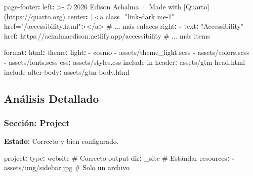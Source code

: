 \documentclass[
  doc,
  floatsintext,
  longtable,
  a4paper,
  nolmodern,
  notxfonts,
  notimes,
  12pt,
  colorlinks=true,linkcolor=blue,citecolor=blue,urlcolor=blue]{apa7}
\newenvironment{Shaded}{\begin{snugshade}}{\end{snugshade}}
\newcommand{\AttributeTok}[1]{\textcolor[rgb]{0.40,0.45,0.13}{#1}}
\newcommand{\CharTok}[1]{\textcolor[rgb]{0.13,0.47,0.30}{#1}}
\newcommand{\CommentTok}[1]{\textcolor[rgb]{0.37,0.37,0.37}{#1}}
\newcommand{\FunctionTok}[1]{\textcolor[rgb]{0.28,0.35,0.67}{#1}}
\newcommand{\KeywordTok}[1]{\textcolor[rgb]{0.00,0.23,0.31}{\textbf{#1}}}
\newcommand{\NormalTok}[1]{\textcolor[rgb]{0.00,0.23,0.31}{#1}}
\newcommand{\StringTok}[1]{\textcolor[rgb]{0.13,0.47,0.30}{#1}}
\begin{document}
\begin{Shaded}
\begin{Highlighting}[]
\AttributeTok{  }\FunctionTok{page{-}footer}\KeywordTok{:}
\FunctionTok{    left}\KeywordTok{: }\CharTok{\textgreater{}{-}}
\NormalTok{      © 2026 Edison Achalma · Made with [Quarto](https://quarto.org)}
\FunctionTok{    center}\KeywordTok{: }\CharTok{|}
\NormalTok{      \textless{}a class="link{-}dark me{-}1" href="/accessibility.html"\textgreater{}\textless{}/a\textgreater{}}
\NormalTok{      \# ... más enlaces}
\AttributeTok{    }\FunctionTok{right}\KeywordTok{:}
\AttributeTok{      }\KeywordTok{{-}}\AttributeTok{ }\FunctionTok{text}\KeywordTok{:}\AttributeTok{ }\StringTok{"Accessibility"}
\AttributeTok{        }\FunctionTok{href}\KeywordTok{:}\AttributeTok{ https://achalmaedison.netlify.app/accessibility}
\CommentTok{      \# ... más items}

\FunctionTok{format}\KeywordTok{:}
\AttributeTok{  }\FunctionTok{html}\KeywordTok{:}
\AttributeTok{    }\FunctionTok{theme}\KeywordTok{:}
\AttributeTok{      }\FunctionTok{light}\KeywordTok{:}
\AttributeTok{        }\KeywordTok{{-}}\AttributeTok{ cosmo}
\AttributeTok{        }\KeywordTok{{-}}\AttributeTok{ assets/theme\_light.scss}
\AttributeTok{        }\KeywordTok{{-}}\AttributeTok{ assets/colors.scss}
\AttributeTok{        }\KeywordTok{{-}}\AttributeTok{ assets/fonts.scss}
\AttributeTok{    }\FunctionTok{css}\KeywordTok{:}\AttributeTok{ assets/styles.css}
\AttributeTok{    }\FunctionTok{include{-}in{-}header}\KeywordTok{:}\AttributeTok{ assets/gtm{-}head.html}
\AttributeTok{    }\FunctionTok{include{-}after{-}body}\KeywordTok{:}\AttributeTok{ assets/gtm{-}body.html}
\end{Highlighting}
\end{Shaded}

\subsection{Análisis Detallado}\label{anuxe1lisis-detallado}

\subsubsection{Sección: Project}\label{secciuxf3n-project-1}

\textbf{Estado:} Correcto y bien configurado.

\begin{Shaded}
\begin{Highlighting}[]
\FunctionTok{project}\KeywordTok{:}
\AttributeTok{  }\FunctionTok{type}\KeywordTok{:}\AttributeTok{ website}\CommentTok{                      \# Correcto}
\AttributeTok{  }\FunctionTok{output{-}dir}\KeywordTok{:}\AttributeTok{ \_site}\CommentTok{                  \# Estándar}
\AttributeTok{  }\FunctionTok{resources}\KeywordTok{:}
\AttributeTok{    }\KeywordTok{{-}}\AttributeTok{ assets/img/sidebar.jpg}\CommentTok{         \# Solo un archivo}
\end{Highlighting}
\end{Shaded}
\end{document}
